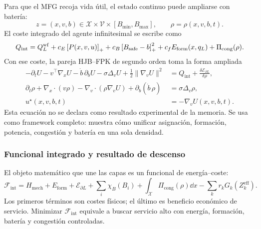 Para que el MFG recoja vida útil, el estado continuo puede ampliarse con batería:
\begin{equation}
  z=(x,v,b)\in\mathcal X\times\mathcal V\times[B_{\min},B_{\max}],
  \qquad
  \rho=\rho(x,v,b,t).
  \label{eq:estado_mfg_bateria}
\end{equation}
El coste integrado del agente infinitesimal se escribe como
\begin{equation}
  Q_{\mathrm{int}}
  =
  Q_L^{\mathrm{wf}}
  +c_E\left[P(x,v,u)\right]_{+}
  +c_B\left[B_{\mathrm{safe}}-b\right]_{+}^{2}
  +c_f E_{\mathrm{form}}(x,q_L)
  +\Pi_{\mathrm{cong}}(\rho).
  \label{eq:coste_mfg_integrado}
\end{equation}
Con ese coste, la pareja HJB--FPK de segundo orden toma la forma ampliada
\begin{equation}
\begin{aligned}
  -\partial_tU
  -v^\top\nabla_xU
  -\dot b\,\partial_bU
  -\sigma\Delta_vU
  +\frac12\|\nabla_vU\|^2
  &=
  Q_{\mathrm{int}}
  +\frac{\delta\mathcal E_{\partial L}}{\delta\rho},\\
  \partial_t\rho
  +\nabla_x\!\cdot(v\rho)
  -\nabla_v\!\cdot(\rho\nabla_vU)
  +\partial_b(\dot b\,\rho)
  &=
  \sigma\Delta_v\rho,\\
  u^\star(x,v,b,t)&=-\nabla_vU(x,v,b,t).
\end{aligned}
\label{eq:mfg_bateria_integrado}
\end{equation}
Esta ecuación no se declara como resultado experimental de la memoria. Se usa como
framework completo: muestra cómo unificar asignación, formación, potencia, congestión y
batería en una sola densidad.

\subsubsection{Funcional integrado y resultado de descenso}

El objeto matemático que une las capas es un funcional de energía--coste:
\begin{equation}
  \mathcal F_{\mathrm{int}}
  =
  H_{\mathrm{mech}}
  +E_{\mathrm{form}}
  +\mathcal E_{\partial L}
  +\sum_i \chi_B(B_i)
  +\int_{\mathcal X}\Pi_{\mathrm{cong}}(\rho)\dd x
  -\sum_k r_kG_k(Z_k^{\mathrm{eff}}).
  \label{eq:funcional_integrado}
\end{equation}
Los primeros términos son costes físicos; el último es beneficio económico de servicio.
Minimizar $\mathcal F_{\mathrm{int}}$ equivale a buscar servicio alto con energía,
formación, batería y congestión controladas.

